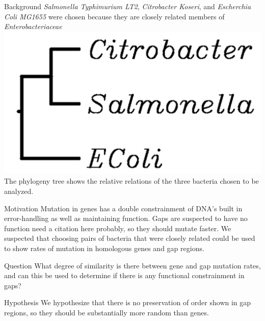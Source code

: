 \documentclass[final]{beamer}
\begin{document}
\begin{frame}{}
\begin{columns}[t]
\begin{column}{.32 \linewidth}
\begin{block}{\large Background}
\newline
\textit{Salmonella Typhimurium LT2}, \textit{Citrobacter Koseri}, and \textit{Escherchia Coli MG1655} were chosen because they are closely related members of \textit{Enterobacteriaceae}
\includegraphics[scale = 1]{phylogeny.png}
\newline
The phylogeny tree shows the relative relations of the three bacteria chosen to be analyzed. 
\end{block}

 \begin{block}{\large Motivation}
Mutation in genes has a double constrainment of DNA's built in error-handling as well as maintaining function. Gaps are suspected to have no function {\color{red} need a citation here probably}, so they should mutate faster. We suspected that choosing pairs of bacteria that were closely related could be used to show rates of mutation in homologous genes and gap regions.
\end{block}

\begin{block}{\large Question}
What degree of similarity is there between gene and gap mutation rates, and can this be used to determine if there is any functional constrainment in gaps? 
\end{block}

 \begin{block}{\large Hypothesis}
We hypothesize that there is no preservation of order shown in gap regions, so they should be substantially more random than genes.

	\end{block}

\end{column}



\end{columns}
\end{frame}
\end{document}

